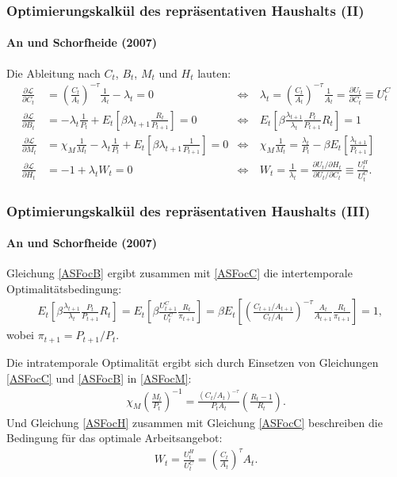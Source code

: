 \documentclass[10pt]{beamer}  %
\begin{document}
\begin{frame}\frametitle{Optimierungskalk\"{u}l des repr\"{a}sentativen Haushalts (II)}\framesubtitle{An und Schorfheide (2007)}
Die Ableitung nach $C_t$, $B_t$, $M_t$ und $H_t$ lauten:
\begin{align}
\frac{\partial\mathcal{L}}{\partial C_t} & =  \left(\frac{C_t}{A_t}\right)^{-\tau} \frac{1}{A_t} -\lambda_t = 0    &\Leftrightarrow~& \lambda_t = \left(\frac{C_t}{A_t}\right)^{-\tau} \frac{1}{A_t}=\frac{\partial U_t}{\partial C_t}\equiv U_t^C\label{ASFocC}\\
\frac{\partial\mathcal{L}}{\partial B_t} & = -\lambda_t \frac{1}{P_t} + E_t\left[\beta  \lambda_{t+1} \frac{R_t}{P_{t+1}}\right]= 0 &\Leftrightarrow~& E_t\left[\beta\frac{\lambda_{t+1}}{\lambda_t} \frac{P_t}{P_{t+1}} R_t \right]=1\label{ASFocB}\\
\frac{\partial\mathcal{L}}{\partial M_t} & = \chi_M \frac{1}{M_t} - \lambda_t \frac{1}{P_t} +  E_t \left[\beta\lambda_{t+1} \frac{1}{P_{t+1}}\right]= 0 &\Leftrightarrow~& \chi_M \frac{1}{M_t} = \frac{\lambda_t}{P_t} - \beta E_t \left[\frac{\lambda_{t+1}}{P_{t+1}}\right]\label{ASFocM}\\
\frac{\partial\mathcal{L}}{\partial H_t} & = -1 + \lambda_t W_t = 0 &\Leftrightarrow~& W_t = \frac{1}{\lambda_t}= \frac{\partial U_t / \partial H_t}{\partial U_t/\partial C_t} \equiv \frac{U_t^H}{U_t^C}\label{ASFocH}.
\end{align}
\hyperlink{OptimHH}{}
\end{frame}

\begin{frame}\frametitle{Optimierungskalk\"{u}l des repr\"{a}sentativen Haushalts (III)}\framesubtitle{An und Schorfheide (2007)}
Gleichung \eqref{ASFocB} ergibt zusammen mit \eqref{ASFocC} die
intertemporale Optimalit\"{a}tsbedingung:
\begin{eqnarray*}
     &E_t \left[ \beta \frac{\lambda_{t+1}}{\lambda_t} \frac{P_t}{P_{t+1}} R_t \right] = E_t \left[ \beta \frac{U_{t+1}^C}{U_t^C}  \frac{R_t}{\pi_{t+1}} \right] = \beta E_t \left[\left(\frac{C_{t+1}/A_{t+1}}{C_t/A_t}\right)^{-\tau} \frac{A_t}{A_{t+1}} \frac{R_t}{\pi_{t+1}} \right] =1,
\end{eqnarray*}
wobei $\pi_{t+1}=P_{t+1}/P_t$.

Die intratemporale Optimalit\"{a}t ergibt sich durch Einsetzen von Gleichungen
\eqref{ASFocC} und \eqref{ASFocB} in \eqref{ASFocM}:
\begin{align*}
\chi_M \left(\frac{M_t}{P_t}\right)^{-1} = \frac{(C_t/A_t)^{-\tau}}{P_t A_t} \left(\frac{R_t-1}{R_t}\right).
\end{align*}
Und Gleichung \eqref{ASFocH} zusammen mit Gleichung \eqref{ASFocC}
beschreiben die Bedingung f\"{u}r das optimale Arbeitsangebot:
\begin{align*}
  W_t = \frac{U_t^H}{U_t^C} = \left(\frac{C_t}{A_t}\right)^\tau A_t.
\end{align*}
\hyperlink{OptimHH}{}
\end{frame}
\end{document}
